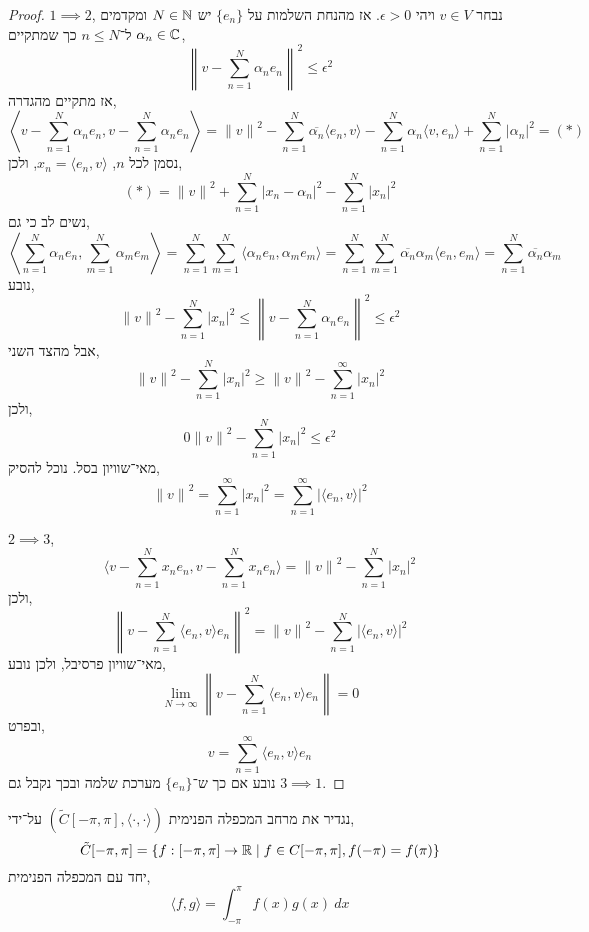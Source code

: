 \begin{proof}
	$1 \implies 2$,
	נבחר $v \in V$ ויהי $\epsilon > 0$.
	אז מהנחת השלמות על $\{ e_n \}$ יש $N \in \mathbb{N}$ ומקדמים $\alpha_n \in \mathbb{C}$ ל־$n \le N$ כך שמתקיים,
	\[
		{\left\lVert v - \sum_{n = 1}^N \alpha_n e_n \right\rVert}^2
		\le \epsilon^2
	\]
	אז מתקיים מהגדרה,
	\[
		\left\langle v - \sum_{n = 1}^N \alpha_n e_n, v - \sum_{n = 1}^N \alpha_n e_n \right\rangle	
		= {\lVert v \rVert}^2 - \sum_{n = 1}^N \overline{\alpha_n} \langle e_n, v \rangle - \sum_{n = 1}^N \alpha_n \langle v, e_n \rangle + \sum_{n = 1}^N {| \alpha_n |}^2
		= (*)
	\]
	נסמן לכל $n$, $x_n = \langle e_n, v \rangle$, ולכן,
	\[
		(*)
		= {\lVert v \rVert}^2 + \sum_{n = 1}^N {| x_n - \alpha_n |}^2 - \sum_{n = 1}^N {| x_n |}^2
	\]
	נשים לב כי גם,
	\[
		\left\langle \sum_{n = 1}^N \alpha_n e_n, \sum_{m = 1}^N \alpha_m e_m \right\rangle
		= \sum_{n = 1}^N \sum_{m = 1}^N \langle \alpha_n e_n, \alpha_m e_m \rangle
		= \sum_{n = 1}^N \sum_{m = 1}^N \overline{\alpha_n} \alpha_m \langle e_n, e_m \rangle
		= \sum_{n = 1}^N \overline{\alpha_n} \alpha_m
	\]
	נובע,
	\[
		{\lVert v \rVert}^2 - \sum_{n = 1}^N {| x_n |}^2
		\le {\left\lVert v - \sum_{n = 1}^N \alpha_n e_n \right\rVert}^2
		\le \epsilon^2
	\]
	אבל מהצד השני,
	\[
		{\lVert v \rVert}^2 - \sum_{n = 1}^N {| x_n |}^2
		\ge {\lVert v \rVert}^2 - \sum_{n = 1}^\infty {| x_n |}^2
	\]
	ולכן,
	\[
		0
		{\lVert v \rVert}^2 - \sum_{n = 1}^N {| x_n |}^2
		\le \epsilon^2
	\]
	מאי־שוויון בסל.
	נוכל להסיק,
	\[
		{\lVert v \rVert}^2 = \sum_{n = 1}^\infty {| x_n |}^2
		= \sum_{n = 1}^\infty {|\langle e_n, v \rangle|}^2
	\]

	$2 \implies 3$,
	\[
		\langle v - \sum_{n = 1}^N x_n e_n, v - \sum_{n = 1}^N x_n e_n \rangle
		= {\lVert v \rVert}^2 - \sum_{n = 1}^N {| x_n |}^2
	\]
	ולכן,
	\[
		{\left\lVert v - \sum_{n = 1}^N \langle e_n, v \rangle e_n \right\rVert}^2
		= {\lVert v \rVert}^2 - \sum_{n = 1}^N {| \langle e_n, v \rangle |}^2
	\]
	מאי־שוויון פרסיבל, ולכן נובע,
	\[
		\lim_{N \to \infty} \left\lVert v - \sum_{n = 1}^N \langle e_n, v \rangle e_n \right\rVert
		= 0
	\]
	ובפרט,
	\[
		v = \sum_{n = 1}^\infty \langle e_n, v \rangle e_n
	\]
	נובע אם כך ש־$\{ e_n \}$ מערכת שלמה ובכך נקבל גם $3 \implies 1$.
\end{proof}
\begin{definition}
	נגדיר את מרחב המכפלה הפנימית $(\tilde{C}[-\pi, \pi], \langle \cdot, \cdot \rangle)$ על־ידי,
	\[
		\tilde{C}[-\pi, \pi]
		= \{ f : [-\pi, \pi] \to \mathbb{R} \mid f \in C[-\pi, \pi], f(-\pi) = f(\pi) \}
	\]
	יחד עם המכפלה הפנימית,
	\[
		\langle f, g \rangle
		= \int_{-\pi}^{\pi} f(x) g(x)\ dx
	\]
\end{definition}
